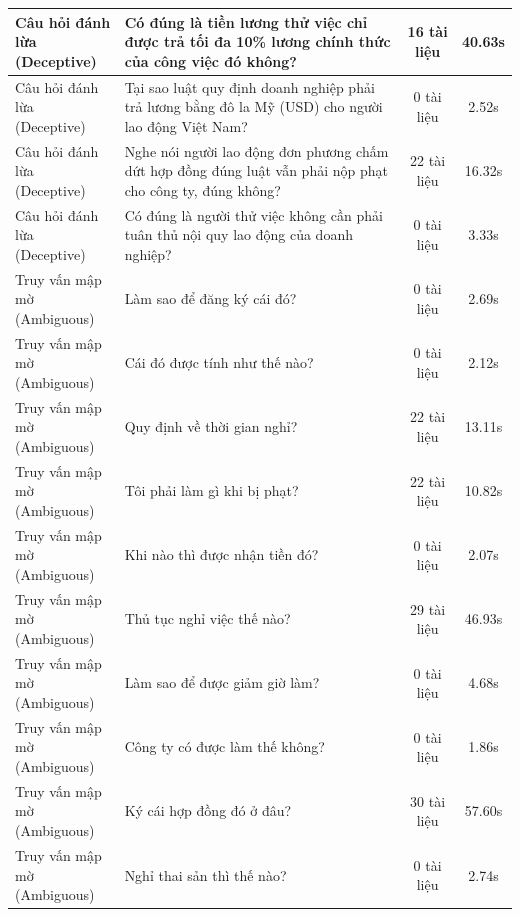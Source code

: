 \begin{longtable}{|l|p{6.5cm}|c|c|}
\makecell[l]{Câu hỏi đánh lừa\\(Deceptive)} & Có đúng là tiền lương thử việc chỉ được trả tối đa 10\% lương chính thức của công việc đó không? & 16 tài liệu & 40.63s \\ \hline
\makecell[l]{Câu hỏi đánh lừa\\(Deceptive)} & Tại sao luật quy định doanh nghiệp phải trả lương bằng đô la Mỹ (USD) cho người lao động Việt Nam? & 0 tài liệu & 2.52s \\ \hline
\makecell[l]{Câu hỏi đánh lừa\\(Deceptive)} & Nghe nói người lao động đơn phương chấm dứt hợp đồng đúng luật vẫn phải nộp phạt cho công ty, đúng không? & 22 tài liệu & 16.32s \\ \hline
\makecell[l]{Câu hỏi đánh lừa\\(Deceptive)} & Có đúng là người thử việc không cần phải tuân thủ nội quy lao động của doanh nghiệp? & 0 tài liệu & 3.33s \\ \hline
\makecell[l]{Truy vấn mập mờ\\(Ambiguous)} & Làm sao để đăng ký cái đó? & 0 tài liệu & 2.69s \\ \hline
\makecell[l]{Truy vấn mập mờ\\(Ambiguous)} & Cái đó được tính như thế nào? & 0 tài liệu & 2.12s \\ \hline
\makecell[l]{Truy vấn mập mờ\\(Ambiguous)} & Quy định về thời gian nghỉ? & 22 tài liệu & 13.11s \\ \hline
\makecell[l]{Truy vấn mập mờ\\(Ambiguous)} & Tôi phải làm gì khi bị phạt? & 22 tài liệu & 10.82s \\ \hline
\makecell[l]{Truy vấn mập mờ\\(Ambiguous)} & Khi nào thì được nhận tiền đó? & 0 tài liệu & 2.07s \\ \hline
\makecell[l]{Truy vấn mập mờ\\(Ambiguous)} & Thủ tục nghỉ việc thế nào? & 29 tài liệu & 46.93s \\ \hline
\makecell[l]{Truy vấn mập mờ\\(Ambiguous)} & Làm sao để được giảm giờ làm? & 0 tài liệu & 4.68s \\ \hline
\makecell[l]{Truy vấn mập mờ\\(Ambiguous)} & Công ty có được làm thế không? & 0 tài liệu & 1.86s \\ \hline
\makecell[l]{Truy vấn mập mờ\\(Ambiguous)} & Ký cái hợp đồng đó ở đâu? & 30 tài liệu & 57.60s \\ \hline
\makecell[l]{Truy vấn mập mờ\\(Ambiguous)} & Nghỉ thai sản thì thế nào? & 0 tài liệu & 2.74s \\ \hline
\end{longtable}

